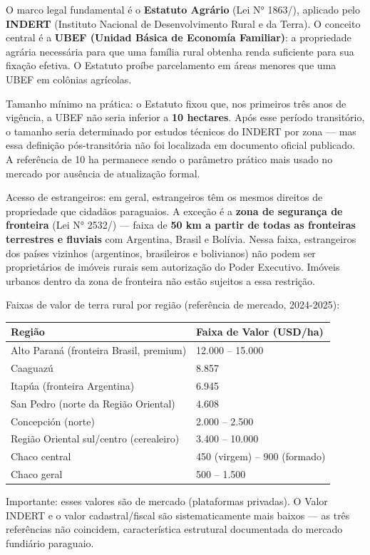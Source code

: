 O marco legal fundamental é o \textbf{Estatuto Agrário} (Lei N°
1863/\allowbreak {}), aplicado pelo \textbf{INDERT} (Instituto Nacional de
Desenvolvimento Rural e da Terra). O conceito central é a \textbf{UBEF
(Unidad Básica de Economía Familiar)}: a propriedade agrária necessária
para que uma família rural obtenha renda suficiente para sua fixação
efetiva. O Estatuto proíbe parcelamento em áreas menores que uma UBEF em
colônias agrícolas.

Tamanho mínimo na prática: o Estatuto fixou que, nos primeiros três anos
de vigência, a UBEF não seria inferior a \textbf{10 hectares}. Após esse
período transitório, o tamanho seria determinado por estudos técnicos do
INDERT por zona --- mas essa definição pós-transitória não foi
localizada em documento oficial publicado. A referência de 10 ha
permanece sendo o parâmetro prático mais usado no mercado por ausência
de atualização formal.

Acesso de estrangeiros: em geral, estrangeiros têm os mesmos direitos de
propriedade que cidadãos paraguaios. A exceção é a \textbf{zona de
segurança de fronteira} (Lei N° 2532/\allowbreak {}) --- faixa de \textbf{50 km a
partir de todas as fronteiras terrestres e fluviais} com Argentina,
Brasil e Bolívia. Nessa faixa, estrangeiros dos países vizinhos
(argentinos, brasileiros e bolivianos) não podem ser proprietários de
imóveis rurais sem autorização do Poder Executivo. Imóveis urbanos
dentro da zona de fronteira não estão sujeitos a essa restrição.

Faixas de valor de terra rural por região (referência de mercado,
2024-2025):

{\def\LTcaptype{none} %
\begin{longtable}[]{@{}ll@{}}
\toprule\noalign{}
Região & Faixa de Valor (USD/\allowbreak \allowbreak ha) \\
\midrule\noalign{}
\endhead
\bottomrule\noalign{}
\endlastfoot
Alto Paraná (fronteira Brasil, premium) & 12.000 -- 15.000 \\
Caaguazú & 8.857 \\
Itapúa (fronteira Argentina) & 6.945 \\
San Pedro (norte da Região Oriental) & 4.608 \\
Concepción (norte) & 2.000 -- 2.500 \\
Região Oriental sul/\allowbreak \allowbreak centro (cerealeiro) & 3.400 -- 10.000 \\
Chaco central & 450 (virgem) -- 900 (formado) \\
Chaco geral & 500 -- 1.500 \\
\end{longtable}
}

Importante: esses valores são de mercado (plataformas privadas). O Valor
INDERT e o valor cadastral/\allowbreak \allowbreak fiscal são sistematicamente mais baixos ---
as três referências não coincidem, característica estrutural documentada
do mercado fundiário paraguaio.
